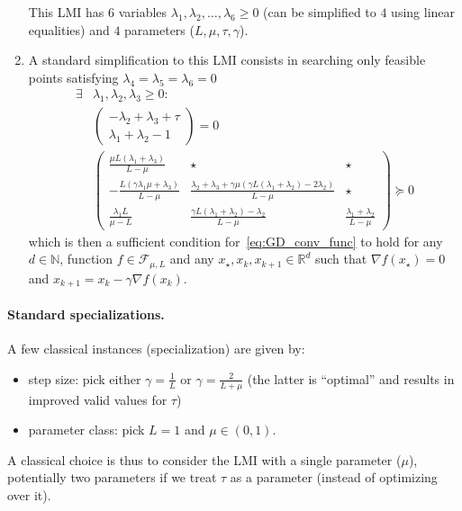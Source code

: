 \documentclass{article}
\renewcommand{\geq}{\geqslant}
\renewcommand{\succeq}{\succcurlyeq}
\begin{document}
\begin{enumerate}
This LMI has $6$ variables $\lambda_1,\lambda_2,\ldots,\lambda_6\geq 0$ (can be simplified to $4$ using linear equalities) and $4$ parameters ($L,\mu,\tau,\gamma$).
	\item A standard simplification to this LMI consists in searching only feasible points satisfying $\lambda_4=\lambda_5=\lambda_6=0$
	\begin{equation*}
\begin{aligned}
\exists &\lambda_1,\lambda_2,\lambda_3\geq 0:\\
&\begin{pmatrix}-\lambda_2+\lambda_3+\tau\\\lambda_1+\lambda_2-1
\end{pmatrix}=0\\
&\begin{pmatrix}
 \frac{\mu  L (\lambda_1+\lambda_3)}{L-\mu } & \star & \star \\
 -\frac{L (\gamma  \lambda_1 \mu +\lambda_3)}{L-\mu} & \frac{\lambda_2+\lambda_3+\gamma  \mu  (\gamma  L (\lambda_1+\lambda_2)-2 \lambda_2)}{L-\mu } & \star \\
 \frac{\lambda_1 L}{\mu -L} & \frac{\gamma  L (\lambda_1+\lambda_2)-\lambda_2}{L-\mu } & \frac{\lambda_1+\lambda_2}{L-\mu }
\end{pmatrix}\succeq 0
\end{aligned}
\end{equation*}
which is then a sufficient condition for~\eqref{eq:GD_conv_func} to hold for any $d\in\mathbb{N}$, function $f\in\mathcal{F}_{\mu,L}$ and any $x_\star,x_k,x_{k+1}\in\mathbb{R}^d$ such that $\nabla f(x_\star)=0$ and $x_{k+1}=x_k-\gamma\nabla f(x_k)$.
\end{enumerate}

\paragraph{Standard specializations.} A few classical instances (specialization) are given by:
\begin{itemize}
	\item step size: pick either $\gamma=\frac1L$ or $\gamma=\frac2{L+\mu}$ (the latter is ``optimal'' and results in improved valid values for $\tau$)
	\item parameter class: pick $L=1$ and $\mu\in(0,1)$.
\end{itemize}
A classical choice is thus to consider the LMI with a single parameter ($\mu$), potentially two parameters if we treat $\tau$ as a parameter (instead of optimizing over it). 
\end{document}
